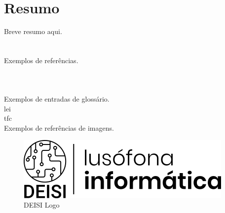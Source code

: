 \chapter*{Resumo}

Breve resumo aqui.\\\\\\
Exemplos de referências.\\
\cite{DEISI}\\
\cite{UL}\\\\
Exemplos de entradas de glossário.\\
\acrshort{lei}\\
\acrshort{tfc}\\
Exemplos de referências de imagens.\\
\begin{figure}[h]
  \includegraphics[width=0.3\linewidth]{images/deisi-logo.png}
  \caption{DEISI Logo}
  \label{fig:deisi}
\end{figure}